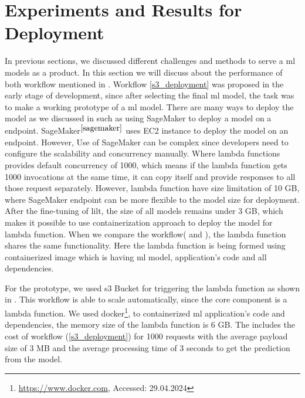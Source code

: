 

\section{Experiments and Results for Deployment}
In previous sections, we discussed different challenges and methods to serve a \acrshort{ml} models as a product. In this section we will discuss about the performance of both workflow mentioned in . Workflow \ref{s3_deployment} was proposed in the early stage of development, since after selecting the final \acrshort{ml} model, the task was to make a working prototype of a \acrshort{ml} model. There are many ways to deploy the model as we discussed in  such as using SageMaker to deploy a model on a endpoint. SageMaker\(^{\ref{sagemaker}}\) uses EC2 instance to deploy the model on an endpoint. However, Use of SageMaker can be complex since developers need to configure the scalability and concurrency manually. Where lambda functions provides default concurrency of 1000, which means if the lambda function gets 1000 invocations at the same time, it can copy itself and provide responses to all those request separately. However, lambda function have size limitation of 10 GB, where SageMaker endpoint can be more flexible to the model size for deployment. After the fine-tuning of \acrshort{lilt}, the size of all models remains under 3 GB, which makes it possible to use containerization approach to deploy the model for lambda function. When we compare the workflow( and ), the lambda function shares the same functionality. Here the lambda function is being formed using containerized image which is having \acrshort{ml} model, application's code and all dependencies.  

For the prototype, we used s3 Bucket for triggering the lambda function as shown in . This workflow is able to scale automatically, since the core component is a lambda function. We used docker\footnote{\url{https://www.docker.com}, Accessed: 29.04.2024}, to containerized \acrshort{ml} application's code and dependencies, the memory size of the lambda function is 6 GB. The  includes the cost of  workflow (\ref{s3_deployment}) for 1000 requests with the average payload size of 3 MB and the average processing time of 3 seconds to get the prediction from the model.

